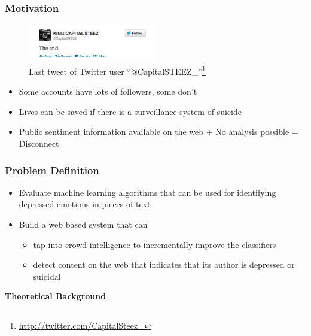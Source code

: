 \documentclass{beamer}
\begin{document}
    \begin{frame}
        \frametitle{Motivation}
        \begin{figure}
            \centering
            \includegraphics[width=0.5\textwidth]{figures/twitter_kcs.png}
            \caption{Last tweet of Twitter user ``@CapitalSTEEZ\_''\footnote{\url{http://twitter.com/CapitalSteez\_}}}
        \end{figure}
        \begin{itemize}
            \item{Some accounts have lots of followers, some don't}
            \item{Lives can be saved if there is a surveillance system of suicide}
            \item{Public sentiment information available on the web + No analysis possible = Disconnect}
        \end{itemize}
    \end{frame}
    
    \begin{frame}
        \frametitle{Problem Definition}
        \begin{itemize}
            \item{Evaluate machine learning algorithms that can be used for identifying depressed emotions in pieces of text}
            \item{
            Build a web based system that can
            \begin{itemize}
                \item{tap into crowd intelligence to incrementally improve the classifiers}
                \item{detect content on the web that indicates that its author is depressed or suicidal}
            \end{itemize}
            }
        \end{itemize}
    \end{frame}
    
    \begin{frame}
        \begin{center}
            \textbf{Theoretical Background}
        \end{center}
    \end{frame}
    
\end{document}
